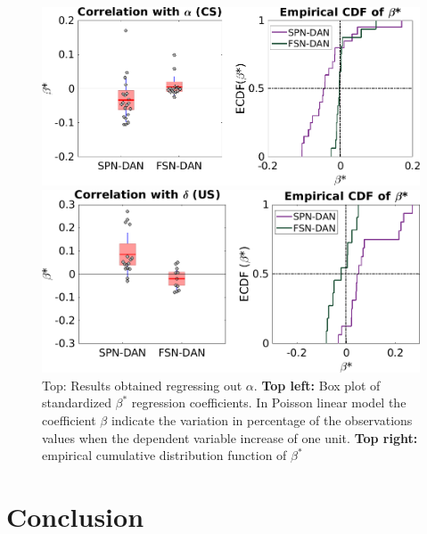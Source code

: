 \begin{figure}[!h]
    \centering
    \includegraphics[scale=0.5]{figures/alphaRegrNew.png}
    
    \vspace{1cm}
    \includegraphics[scale=0.5]{figures/deltaRegr.png}
    \caption{Top: Results obtained regressing out $\alpha$. \textbf{Top left:} Box plot of standardized $\beta^*$ regression coefficients. In Poisson linear model the coefficient $\beta$ indicate the variation in percentage of the observations values when the dependent variable increase of one unit. \textbf{Top right:} empirical cumulative distribution function of $\beta^*$}
    \label{fig:AlphaDeltaReg}
\end{figure}
    
    
\section{Conclusion}



